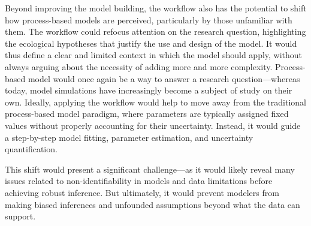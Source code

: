 \documentclass[11pt]{article}
\begin{document}
Beyond improving the model building, the workflow also has the potential to shift how process-based models are perceived, particularly by those unfamiliar with them. The workflow could refocus attention on the research question, highlighting the ecological hypotheses that justify the use and design of the model. It would thus define a clear and limited context in which the model should apply, without always arguing about the necessity of adding more and more complexity.  %
Process-based model would once again be a way to answer a research question---whereas today, model simulations have increasingly become a subject of study on their own.
Ideally, applying the workflow would help to move away from the traditional process-based model paradigm, where parameters are typically assigned fixed values without properly accounting for their uncertainty. Instead, it would guide a step-by-step model fitting, parameter estimation, and uncertainty quantification. 

This shift would present a significant challenge---as it would likely reveal many issues related to non-identifiability in models and data limitations before achieving robust inference. But ultimately, it would prevent modelers from making biased inferences and unfounded assumptions beyond what the data can support. 
\end{document}

